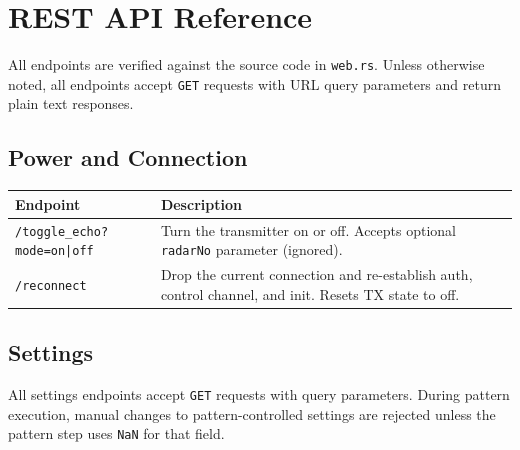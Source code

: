 \documentclass[11pt,letterpaper]{article}
\begin{document}
\newpage
\section{REST API Reference}
\label{sec:rest-api}

All endpoints are verified against the source code in \texttt{web.rs}. Unless otherwise noted, all endpoints accept \texttt{GET} requests with URL query parameters and return plain text responses.

\subsection{Power and Connection}
\label{subsec:api-power}

\begin{longtable}{l p{10cm}}
\toprule
\textbf{Endpoint} & \textbf{Description} \\
\midrule
\texttt{/toggle\_echo?mode=on|off} & Turn the transmitter on or off. Accepts optional \texttt{radarNo} parameter (ignored). \\
\texttt{/reconnect} & Drop the current connection and re-establish auth, control channel, and init. Resets TX state to off. \\
\bottomrule
\end{longtable}

\subsection{Settings}
\label{subsec:api-settings}

All settings endpoints accept \texttt{GET} requests with query parameters. During pattern execution, manual changes to pattern-controlled settings are rejected unless the pattern step uses \texttt{NaN} for that field.
\end{document}
